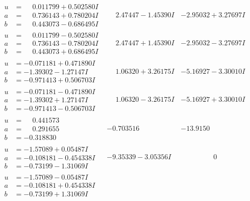 \documentclass[1p]{elsarticle_modified}
\theoremstyle{definition}
\begin{document}
$$\begin{array}{c|c|c}
\begin{aligned}
u &= \phantom{-}0.011799 + 0.502580 I \\
a &= \phantom{-}0.736143 + 0.780204 I \\
b &= \phantom{-}0.443073 - 0.686495 I\end{aligned}
 & \phantom{-}2.47447 - 1.45390 I & -2.95032 + 3.27697 I \\ \hline\begin{aligned}
u &= \phantom{-}0.011799 - 0.502580 I \\
a &= \phantom{-}0.736143 - 0.780204 I \\
b &= \phantom{-}0.443073 + 0.686495 I\end{aligned}
 & \phantom{-}2.47447 + 1.45390 I & -2.95032 - 3.27697 I \\ \hline\begin{aligned}
u &= -0.071181 + 0.471890 I \\
a &= -1.39302 - 1.27147 I \\
b &= -0.971413 + 0.506703 I\end{aligned}
 & \phantom{-}1.06320 + 3.26175 I & -5.16927 - 3.30010 I \\ \hline\begin{aligned}
u &= -0.071181 - 0.471890 I \\
a &= -1.39302 + 1.27147 I \\
b &= -0.971413 - 0.506703 I\end{aligned}
 & \phantom{-}1.06320 - 3.26175 I & -5.16927 + 3.30010 I \\ \hline\begin{aligned}
u &= \phantom{-}0.441573\phantom{ +0.000000I} \\
a &= \phantom{-}0.291655\phantom{ +0.000000I} \\
b &= -0.318830\phantom{ +0.000000I}\end{aligned}
 & -0.703516\phantom{ +0.000000I} & -13.9150\phantom{ +0.000000I} \\ \hline\begin{aligned}
u &= -1.57089 + 0.05487 I \\
a &= -0.108181 - 0.454338 I \\
b &= -0.73199 - 1.31069 I\end{aligned}
 & -9.35339 - 3.05356 I & \phantom{-0.000000 } 0 \\ \hline\begin{aligned}
u &= -1.57089 - 0.05487 I \\
a &= -0.108181 + 0.454338 I \\
b &= -0.73199 + 1.31069 I\end{aligned}

\end{array}$$
\end{document}
